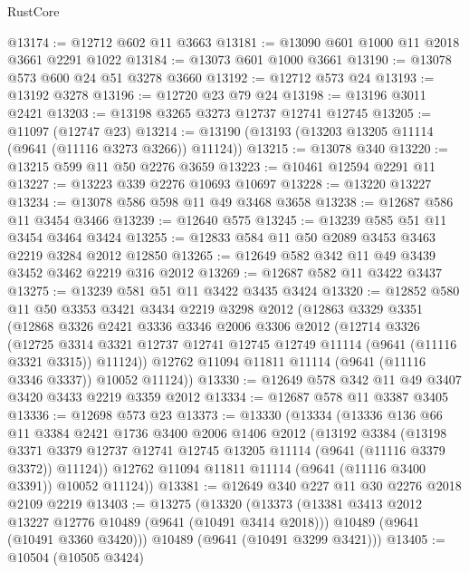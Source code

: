 \begin{lexlean}{RustCore}
\begin{coremodule}
@13174 := @12712 @602 @11 @3663
@13181 := @13090 @601 @1000 @11 @2018 @3661 @2291 @1022
@13184 := @13073 @601 @1000 @3661
@13190 := @13078 @573 @600 @24 @51 @3278 @3660
@13192 := @12712 @573 @24
@13193 := @13192 @3278
@13196 := @12720 @23 @79 @24
@13198 := @13196 @3011 @2421
@13203 := @13198 @3265 @3273 @12737 @12741 @12745
@13205 := @11097 (@12747 @23)
@13214 := @13190 (@13193 (@13203 @13205 @11114 (@9641 (@11116 @3273 @3266)) @11124))
@13215 := @13078 @340
@13220 := @13215 @599 @11 @50 @2276 @3659
@13223 := @10461 @12594 @2291 @11
@13227 := @13223 @339 @2276 @10693 @10697
@13228 := @13220 @13227
@13234 := @13078 @586 @598 @11 @49 @3468 @3658
@13238 := @12687 @586 @11 @3454 @3466
@13239 := @12640 @575
@13245 := @13239 @585 @51 @11 @3454 @3464 @3424
@13255 := @12833 @584 @11 @50 @2089 @3453 @3463 @2219 @3284 @2012 @12850
@13265 := @12649 @582 @342 @11 @49 @3439 @3452 @3462 @2219 @316 @2012
@13269 := @12687 @582 @11 @3422 @3437
@13275 := @13239 @581 @51 @11 @3422 @3435 @3424
@13320 := @12852
    @580
    @11
    @50
    @3353
    @3421
    @3434
    @2219
    @3298
    @2012
    (@12863
      @3329
      @3351
      (@12868
        @3326
        @2421
        @3336
        @3346
        @2006
        @3306
        @2012
        (@12714
          @3326
          (@12725
            @3314
            @3321
            @12737
            @12741
            @12745
            @12749
            @11114
            (@9641 (@11116 @3321 @3315))
            @11124))
        @12762
        @11094
        @11811
        @11114
        (@9641 (@11116 @3346 @3337))
        @10052
        @11124))
@13330 := @12649 @578 @342 @11 @49 @3407 @3420 @3433 @2219 @3359 @2012
@13334 := @12687 @578 @11 @3387 @3405
@13336 := @12698 @573 @23
@13373 := @13330
    (@13334
      (@13336
        @136
        @66
        @11
        @3384
        @2421
        @1736
        @3400
        @2006
        @1406
        @2012
        (@13192
          @3384
          (@13198
            @3371
            @3379
            @12737
            @12741
            @12745
            @13205
            @11114
            (@9641 (@11116 @3379 @3372))
            @11124))
        @12762
        @11094
        @11811
        @11114
        (@9641 (@11116 @3400 @3391))
        @10052
        @11124))
@13381 := @12649 @340 @227 @11 @30 @2276 @2018 @2109 @2219
@13403 := @13275
    (@13320
      (@13373
        (@13381 @3413 @2012 @13227 @12776 @10489 (@9641 (@10491 @3414 @2018)))
        @10489
        (@9641 (@10491 @3360 @3420)))
      @10489
      (@9641 (@10491 @3299 @3421)))
@13405 := @10504 (@10505 @3424)

\end{coremodule}
\end{lexlean}
